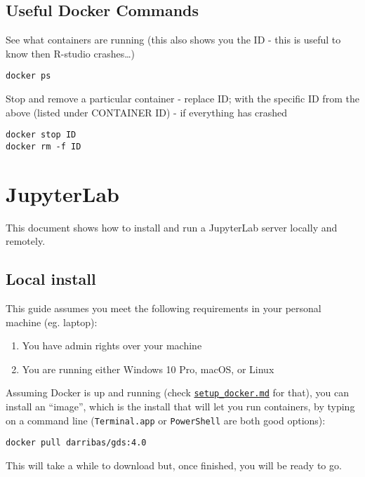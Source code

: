 \documentclass[]{book}
\providecommand{\tightlist}{%
  \setlength{\itemsep}{0pt}\setlength{\parskip}{0pt}}
\begin{document}
\section{Useful Docker Commands}\label{useful-docker-commands}

See what containers are running (this also shows you the ID - this is
useful to know then R-studio crashes\ldots{})

\begin{verbatim}
docker ps
\end{verbatim}

Stop and remove a particular container - replace ID; with the specific
ID from the above (listed under CONTAINER ID) - if everything has
crashed

\begin{verbatim}
docker stop ID
docker rm -f ID
\end{verbatim}

\chapter{JupyterLab}\label{jupyterlab}

This document shows how to install and run a JupyterLab server locally
and remotely.

\section{Local install}\label{local-install}

This guide assumes you meet the following requirements in your personal
machine (eg. laptop):

\begin{enumerate}
\def\labelenumi{\arabic{enumi}.}
\tightlist
\item
  You have admin rights over your machine
\item
  You are running either Windows 10 Pro, macOS, or Linux
\end{enumerate}

Assuming Docker is up and running (check
\href{setup_docker.md}{\texttt{setup\_docker.md}} for that), you can
install an ``image'', which is the install that will let you run
containers, by typing on a command line (\texttt{Terminal.app} or
\texttt{PowerShell} are both good options):

\begin{verbatim}
docker pull darribas/gds:4.0
\end{verbatim}

This will take a while to download but, once finished, you will be ready
to go.
\end{document}
